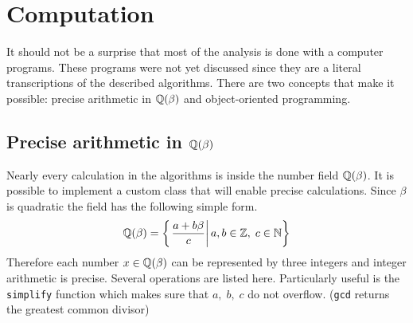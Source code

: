 \documentclass[text.tex]{subfiles}
\begin{document}
\section*{Computation}
It should not be a surprise that most of the analysis is done with a computer programs. These programs were not yet discussed since they are a literal transcriptions of the described algorithms. There are two concepts that make it possible: precise arithmetic in $\mathbb{Q}(\beta)$ and object-oriented programming. 
\subsection{Precise arithmetic in $\mathbb{Q}(\beta)$}
Nearly every calculation in the algorithms is inside the number field $\mathbb{Q}(\beta)$. It is possible to implement a custom class that will enable precise calculations. Since $\beta$ is quadratic the field has the following simple form.
$$\mathbb{Q}(\beta) = \left\{\left. \frac{a + b\beta}{c} \right|a,b\in \mathbb{Z},\; c\in\mathbb{N} \right\}$$
Therefore each number $x\in\mathbb{Q}(\beta)$ can be represented by three integers and integer arithmetic is precise. Several operations are listed here. Particularly useful is the \texttt{simplify} function which makes sure that $a,\;b,\;c$ do not overflow. (\texttt{gcd} returns the greatest common divisor)

	
	
	
  
\end{document}
